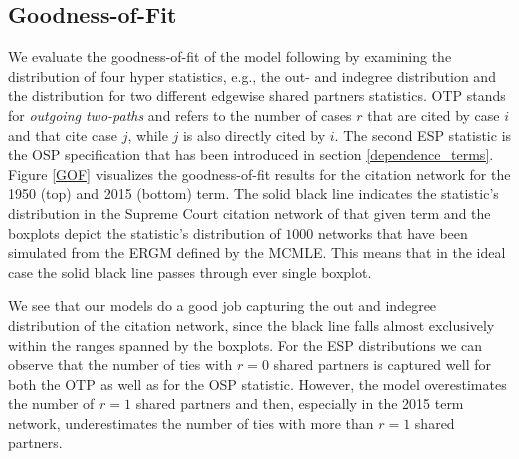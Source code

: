 \documentclass[headsepline=true, abstracton]{scrartcl}
\begin{document}
\subsection{Goodness-of-Fit}
We evaluate the goodness-of-fit of the model following \citet{Hunter.2008} by examining the distribution of four hyper statistics, e.g., the out- and indegree distribution and the distribution for two different edgewise shared partners statistics. OTP stands for \textit{outgoing two-paths} and refers to the number of cases $r$ that are cited by case $i$ and that cite case $j$, while $j$ is also directly cited by $i$. The second ESP statistic is the OSP specification that has been introduced in section \ref{dependence_terms}. Figure \ref{GOF} visualizes the goodness-of-fit results for the citation network for the 1950 (top) and 2015 (bottom) term. The solid black line indicates the statistic's distribution in the Supreme Court citation network of that given term and the boxplots depict the statistic's distribution of $1000$ networks that have been simulated from the ERGM defined by the MCMLE. This means that in the ideal case the solid black line passes through ever single boxplot.


We see that our models do a good job capturing the out and indegree distribution of the citation network, since the black line falls almost exclusively within the ranges spanned by the boxplots. For the ESP distributions we can observe that the number of ties with $r=0$ shared partners is captured well for both the OTP as well as for the OSP statistic. However, the model overestimates the number of $r=1$ shared partners and then, especially in the 2015 term network, underestimates the number of ties with more than $r=1$ shared partners. 
\end{document}
